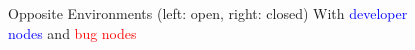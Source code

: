 \documentclass[10pt, a4paper, fleqn]{article}
\begin{document}
\begin{figure}[hbt!]
	\centering
	\caption{Opposite Environments (left: open, right: closed) With \textcolor{blue}{developer nodes} and \textcolor{red}{bug nodes}}
\end{figure}
\end{document}
